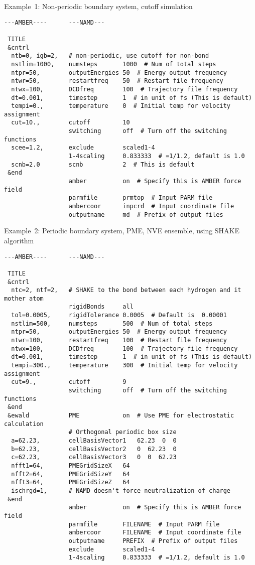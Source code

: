 \noindent Example~1: Non-periodic boundary system, cutoff simulation

\begin{verbatim}
---AMBER----      ---NAMD---

 TITLE
 &cntrl
  ntb=0, igb=2,   # non-periodic, use cutoff for non-bond
  nstlim=1000,    numsteps       1000  # Num of total steps
  ntpr=50,        outputEnergies 50  # Energy output frequency
  ntwr=50,        restartfreq    50  # Restart file frequency
  ntwx=100,       DCDfreq        100  # Trajectory file frequency
  dt=0.001,       timestep       1  # in unit of fs (This is default)
  tempi=0.,       temperature    0  # Initial temp for velocity assignment
  cut=10.,        cutoff         10
                  switching      off  # Turn off the switching functions
  scee=1.2,       exclude        scaled1-4
                  1-4scaling     0.833333  # =1/1.2, default is 1.0
  scnb=2.0        scnb           2  # This is default
 &end
                  amber          on  # Specify this is AMBER force field
                  parmfile       prmtop  # Input PARM file
                  ambercoor      inpcrd  # Input coordinate file
                  outputname     md  # Prefix of output files
\end{verbatim}

\noindent Example~2: Periodic boundary system, PME, NVE ensemble,
using SHAKE algorithm

\begin{verbatim}
---AMBER----      ---NAMD---

 TITLE
 &cntrl
  ntc=2, ntf=2,   # SHAKE to the bond between each hydrogen and it mother atom
                  rigidBonds     all
  tol=0.0005,     rigidTolerance 0.0005  # Default is  0.00001
  nstlim=500,     numsteps       500  # Num of total steps
  ntpr=50,        outputEnergies 50  # Energy output frequency
  ntwr=100,       restartfreq    100  # Restart file frequency
  ntwx=100,       DCDfreq        100  # Trajectory file frequency
  dt=0.001,       timestep       1  # in unit of fs (This is default)
  tempi=300.,     temperature    300  # Initial temp for velocity assignment
  cut=9.,         cutoff         9
                  switching      off  # Turn off the switching functions
 &end
 &ewald           PME            on  # Use PME for electrostatic calculation
                  # Orthogonal periodic box size
  a=62.23,        cellBasisVector1   62.23  0  0
  b=62.23,        cellBasisVector2   0  62.23  0
  c=62.23,        cellBasisVector3   0  0  62.23
  nfft1=64,       PMEGridSizeX   64
  nfft2=64,       PMEGridSizeY   64
  nfft3=64,       PMEGridSizeZ   64
  ischrgd=1,      # NAMD doesn't force neutralization of charge
 &end
                  amber          on  # Specify this is AMBER force field
                  parmfile       FILENAME  # Input PARM file
                  ambercoor      FILENAME  # Input coordinate file
                  outputname     PREFIX  # Prefix of output files
                  exclude        scaled1-4
                  1-4scaling     0.833333  # =1/1.2, default is 1.0
\end{verbatim}
